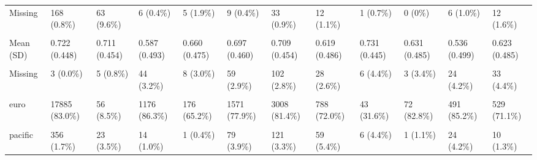 \documentclass[
  single column]{article}
\begin{document}
\begin{landscape}
\begin{longtable}[t]{llllllllllll}
\addlinespace
Missing & 168 (0.8\%) & 63 (9.6\%) & 6 (0.4\%) & 5 (1.9\%) & 9 (0.4\%) & 33 (0.9\%) & 12 (1.1\%) & 1 (0.7\%) & 0 (0\%) & 6 (1.0\%) & 12 (1.6\%)\\
\cellcolor{gray!10}{Employment Status (Employed/Unemployed)} & \cellcolor{gray!10}{} & \cellcolor{gray!10}{} & \cellcolor{gray!10}{} & \cellcolor{gray!10}{} & \cellcolor{gray!10}{} & \cellcolor{gray!10}{} & \cellcolor{gray!10}{} & \cellcolor{gray!10}{} & \cellcolor{gray!10}{} & \cellcolor{gray!10}{} & \cellcolor{gray!10}{}\\
Mean (SD) & 0.722 (0.448) & 0.711 (0.454) & 0.587 (0.493) & 0.660 (0.475) & 0.697 (0.460) & 0.709 (0.454) & 0.619 (0.486) & 0.731 (0.445) & 0.631 (0.485) & 0.536 (0.499) & 0.623 (0.485)\\
\cellcolor{gray!10}{Median [Min, Max]} & \cellcolor{gray!10}{1.00 [0, 1.00]} & \cellcolor{gray!10}{1.00 [0, 1.00]} & \cellcolor{gray!10}{1.00 [0, 1.00]} & \cellcolor{gray!10}{1.00 [0, 1.00]} & \cellcolor{gray!10}{1.00 [0, 1.00]} & \cellcolor{gray!10}{1.00 [0, 1.00]} & \cellcolor{gray!10}{1.00 [0, 1.00]} & \cellcolor{gray!10}{1.00 [0, 1.00]} & \cellcolor{gray!10}{1.00 [0, 1.00]} & \cellcolor{gray!10}{1.00 [0, 1.00]} & \cellcolor{gray!10}{1.00 [0, \vphantom{1} 1.00]}\\
Missing & 3 (0.0\%) & 5 (0.8\%) & 44 (3.2\%) & 8 (3.0\%) & 59 (2.9\%) & 102 (2.8\%) & 28 (2.6\%) & 6 (4.4\%) & 3 (3.4\%) & 24 (4.2\%) & 33 (4.4\%)\\
\addlinespace
\cellcolor{gray!10}{Ethnicity Category} & \cellcolor{gray!10}{} & \cellcolor{gray!10}{} & \cellcolor{gray!10}{} & \cellcolor{gray!10}{} & \cellcolor{gray!10}{} & \cellcolor{gray!10}{} & \cellcolor{gray!10}{} & \cellcolor{gray!10}{} & \cellcolor{gray!10}{} & \cellcolor{gray!10}{} & \cellcolor{gray!10}{}\\
euro & 17885 (83.0\%) & 56 (8.5\%) & 1176 (86.3\%) & 176 (65.2\%) & 1571 (77.9\%) & 3008 (81.4\%) & 788 (72.0\%) & 43 (31.6\%) & 72 (82.8\%) & 491 (85.2\%) & 529 (71.1\%)\\
\cellcolor{gray!10}{maori} & \cellcolor{gray!10}{2335 (10.8\%)} & \cellcolor{gray!10}{13 (2.0\%)} & \cellcolor{gray!10}{143 (10.5\%)} & \cellcolor{gray!10}{23 (8.5\%)} & \cellcolor{gray!10}{194 (9.6\%)} & \cellcolor{gray!10}{340 (9.2\%)} & \cellcolor{gray!10}{205 (18.7\%)} & \cellcolor{gray!10}{5 (3.7\%)} & \cellcolor{gray!10}{6 (6.9\%)} & \cellcolor{gray!10}{59 (10.2\%)} & \cellcolor{gray!10}{159 (21.4\%)}\\
pacific & 356 (1.7\%) & 23 (3.5\%) & 14 (1.0\%) & 1 (0.4\%) & 79 (3.9\%) & 121 (3.3\%) & 59 (5.4\%) & 6 (4.4\%) & 1 (1.1\%) & 24 (4.2\%) & 10 (1.3\%)\\

\end{longtable}
\end{landscape}
\end{document}
